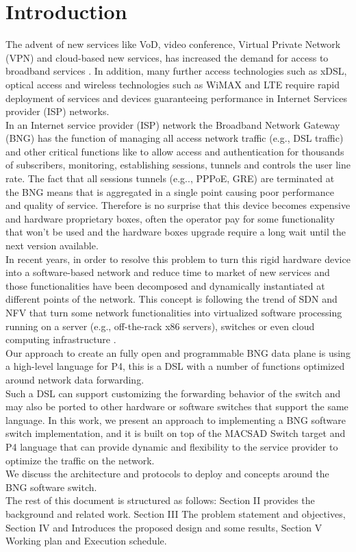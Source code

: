 \chapter{Introduction}
\label{cap:intro}
The advent of new services like \acrfull{VoD}, video conference, Virtual Private Network (VPN) and cloud-based new services, has increased the demand for access to broadband services \cite{improv}.  In addition, many further access technologies such as xDSL, optical access and wireless technologies such as WiMAX and LTE require rapid deployment of services and devices guaranteeing performance in Internet Services provider (ISP) networks.\\
In an Internet service provider (ISP) network the Broadband Network Gateway (BNG) has the function of managing all access network traffic (e.g., DSL traffic) and other critical functions like to allow access and authentication for thousands of subscribers, monitoring, establishing sessions, tunnels and controls the user line rate.  The fact that all sessions tunnels (e.g.., PPPoE, GRE) are terminated at the BNG means that is aggregated in a single point causing poor performance and quality of service.
Therefore is no surprise that this device becomes expensive and hardware proprietary boxes, often the operator pay for some functionality that won’t be used and the hardware boxes upgrade require a long wait until the next version available.\\
In recent years, in order to resolve this problem to turn this rigid hardware device into a software-based network and reduce time to market of new services and those functionalities have been decomposed and dynamically instantiated at different points of the network. This concept is following the trend of \acrfull{SDN}  and \acrfull{NFV} that turn some network functionalities into virtualized software processing running on a server (e.g., off-the-rack x86 servers), switches or even cloud computing infrastructure \cite{nfv}.\\
Our approach to create an fully open and programmable BNG data plane is using a high-level language for \acrfull{P4}, this is a \acrfull{DSL} with a number of functions optimized around network data forwarding.\\
Such a DSL can support customizing the forwarding behavior of the switch and may also be ported to other hardware or software switches that support the same language.
In this work, we present an approach to implementing a BNG software switch implementation, and it is built on top of the MACSAD Switch target and P4 language that can provide dynamic and flexibility to the service provider to optimize the traffic on the network.\\
We discuss the architecture and protocols to deploy and concepts around the BNG software switch.\\
The rest of this document is structured as follows: Section II provides the background and related work.  Section III The problem statement and objectives, Section IV and Introduces the proposed design and some results, Section V Working plan and Execution schedule.

